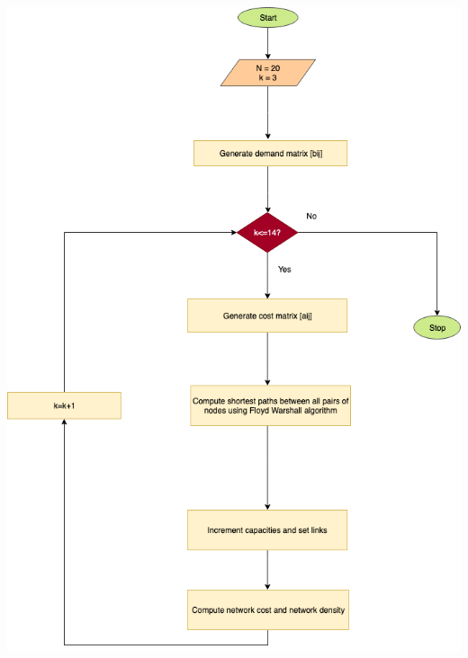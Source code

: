 \documentclass[12pt,letterpaper,titlepage,en-US]{article}
\begin{document}
\begin{itemize}
  \includegraphics[scale=0.6]{fig/flowchart.png}
\end{itemize}
\end{document}
